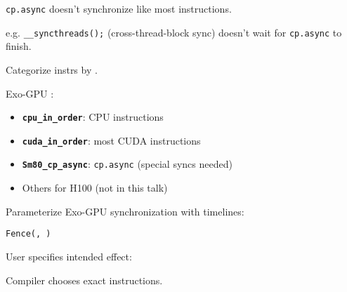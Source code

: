 \begin{center}
\Large
\begin{tikzpicture}[node distance=0mm]

\end{tikzpicture}
\end{center}


\newpage
{}

{\LARGE
\texttt{cp.async} doesn't synchronize like most instructions.

e.g. \texttt{\_\_syncthreads();} (cross-thread-block sync) doesn't wait for \texttt{cp.async} to finish.

}
\vfill

\begin{center}
\Large
\begin{tikzpicture}[node distance=0mm]

\end{tikzpicture}
\end{center}

\newpage
{}

{\LARGE
Categorize instrs by .

Exo-GPU :
\begin{itemize}
  \item \textbf{\texttt{cpu\_in\_order}}: CPU instructions
  \item \textbf{\texttt{cuda\_in\_order}}: most CUDA instructions
  \item \textbf{\texttt{Sm80\_cp\_async}}: \texttt{cp.async} (special syncs needed)
  \item Others for H100 (not in this talk)
\end{itemize}

}

\newpage
{}

{\LARGE
Parameterize Exo-GPU synchronization with timelines:

\begin{center}
  \texttt{Fence(, )}
\end{center}

User specifies intended effect:

\begin{center}
\end{center}

Compiler chooses exact instructions.


}

